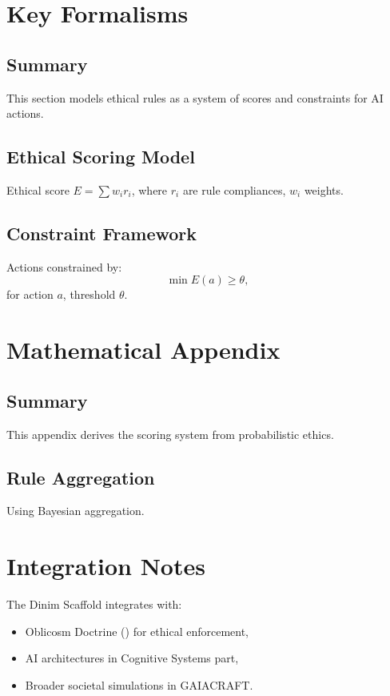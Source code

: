 \documentclass[11pt,oneside]{memoir}
\theoremstyle{plain}
\begin{document}
\section{Key Formalisms}
\subsection{Summary}
This section models ethical rules as a system of scores and constraints for AI actions.

\subsection{Ethical Scoring Model}
Ethical score \(E = \sum w_i r_i\), where \(r_i\) are rule compliances, \(w_i\) weights.

\subsection{Constraint Framework}
Actions constrained by:
\begin{equation}
    \min E(a) \geq \theta,
\end{equation}
for action \(a\), threshold \(\theta\).

\section{Mathematical Appendix}
\subsection{Summary}
This appendix derives the scoring system from probabilistic ethics.

\subsection{Rule Aggregation}
Using Bayesian aggregation.

\section{Integration Notes}
The Dinim Scaffold integrates with:
\begin{itemize}
    \item Oblicosm Doctrine () for ethical enforcement,
    \item AI architectures in Cognitive Systems part,
    \item Broader societal simulations in GAIACRAFT.
\end{itemize}
\end{document}
